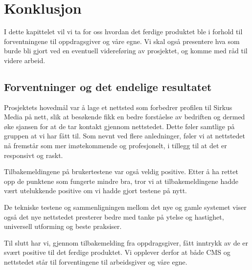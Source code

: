 \cleardoublepage
\chapter{Konklusjon}
\label{chap:conclusion} 

I dette kapittelet vil vi ta for oss hvordan det ferdige produktet ble i forhold til forventningene til oppdragsgiver og våre egne.  Vi skal også presentere hva som burde bli gjort ved en eventuell videreføring av prosjektet, og komme med råd til videre arbeid.

\section{Forventninger og det endelige resultatet}
Prosjektets hovedmål var å lage et nettsted som forbedrer profilen til Sirkus Media på nett, slik at besøkende fikk en bedre forståelse av bedriften og dermed øke sjansen for at de tar kontakt gjennom nettstedet. Dette føler samtlige på gruppen at vi har fått til. Som nevnt ved flere anledninger, føler vi at nettstedet nå fremstår som mer imøtekommende og profesjonelt, i tillegg til at det er responsivt og raskt.

Tilbakemeldingene på brukertestene var også veldig positive. Etter å ha rettet opp de punktene som fungerte mindre bra, tror vi at tilbakemeldingene hadde vært utelukkende positive om vi hadde gjort testene på nytt. 

De tekniske testene og sammenligningen mellom det nye og gamle systemet viser også det nye nettstedet presterer bedre med tanke på ytelse og hastighet, universell utforming og beste praksiser.

Til slutt har vi, gjennom tilbakemelding fra oppdragsgiver, fått inntrykk av de er svært positive til det ferdige produktet. Vi opplever derfor at både CMS og nettstedet står til forventingene til arbeidsgiver og våre egne.

